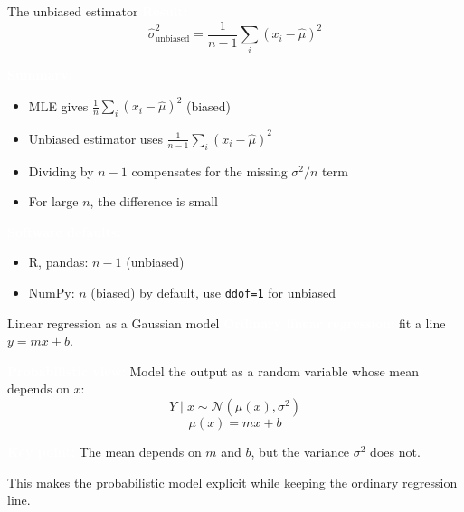 \documentclass[aspectratio=169]{beamer}
\renewcommand{\textbf}[1]{\textcolor{white}{\bfseries #1}}
\begin{document}
\begin{frame}[c]{The unbiased estimator}
\textbf{Result:}
\[
\hat{\sigma}^2_{\text{unbiased}} = \frac{1}{n-1} \sum_i (x_i - \hat{\mu})^2
\]

\vspace{1em}
\textbf{Summary:}
\begin{itemize}
    \item MLE gives $\frac{1}{n}\sum_i(x_i - \hat{\mu})^2$ (biased)
    \item Unbiased estimator uses $\frac{1}{n-1}\sum_i(x_i - \hat{\mu})^2$
    \item Dividing by $n-1$ compensates for the missing $\sigma^2/n$ term
    \item For large $n$, the difference is small
\end{itemize}

\vspace{1em}
\textbf{Software defaults:}
\begin{itemize}
    \item R, pandas: $n-1$ (unbiased)
    \item NumPy: $n$ (biased) by default, use \texttt{ddof=1} for unbiased
\end{itemize}
\end{frame}

\begin{frame}[c]{Linear regression as a Gaussian model}
\textbf{Ordinary linear regression:} fit a line $y = mx + b$.

\vspace{1em}
\textbf{Probabilistic view:} Model the output as a random variable whose mean depends on $x$:
\[
Y \mid x \sim \mathcal{N}(\mu(x), \sigma^2)
\]
\[
\mu(x) = mx + b
\]

\vspace{0.5em}
\textbf{Key point:} The mean depends on $m$ and $b$, but the variance $\sigma^2$ does not.

\vspace{0.5em}
This makes the probabilistic model explicit while keeping the ordinary regression line.
\end{frame}
\end{document}
